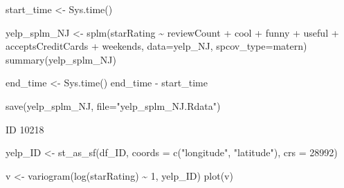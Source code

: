 \documentclass[
  12pt,
  letterpaper,
  DIV=11,
  numbers=noendperiod]{scrartcl}
\newenvironment{Shaded}{\begin{snugshade}}{\end{snugshade}}
\newcommand{\AttributeTok}[1]{\textcolor[rgb]{0.98,0.46,0.51}{#1}}
\newcommand{\DecValTok}[1]{\textcolor[rgb]{0.47,0.72,1.00}{#1}}
\newcommand{\FunctionTok}[1]{\textcolor[rgb]{0.70,0.57,0.94}{#1}}
\newcommand{\NormalTok}[1]{\textcolor[rgb]{0.88,0.89,0.91}{#1}}
\newcommand{\OtherTok}[1]{\textcolor[rgb]{0.70,0.57,0.94}{#1}}
\newcommand{\SpecialCharTok}[1]{\textcolor[rgb]{0.47,0.72,1.00}{#1}}
\newcommand{\StringTok}[1]{\textcolor[rgb]{0.62,0.80,1.00}{#1}}
\begin{document}
\begin{Shaded}
\begin{Highlighting}[]
\NormalTok{start\_time }\OtherTok{\textless{}{-}} \FunctionTok{Sys.time}\NormalTok{()}


\NormalTok{yelp\_splm\_NJ }\OtherTok{\textless{}{-}} \FunctionTok{splm}\NormalTok{(starRating }\SpecialCharTok{\textasciitilde{}}\NormalTok{ reviewCount }\SpecialCharTok{+}\NormalTok{ cool }\SpecialCharTok{+}\NormalTok{ funny }\SpecialCharTok{+}\NormalTok{ useful }\SpecialCharTok{+}\NormalTok{ acceptsCreditCards }\SpecialCharTok{+}\NormalTok{ weekends, }\AttributeTok{data=}\NormalTok{yelp\_NJ, }\AttributeTok{spcov\_type=}\StringTok{\textquotesingle{}matern\textquotesingle{}}\NormalTok{)}
\FunctionTok{summary}\NormalTok{(yelp\_splm\_NJ)}

\NormalTok{end\_time }\OtherTok{\textless{}{-}} \FunctionTok{Sys.time}\NormalTok{()}
\NormalTok{end\_time }\SpecialCharTok{{-}}\NormalTok{ start\_time}
\end{Highlighting}
\end{Shaded}

\begin{Shaded}
\begin{Highlighting}[]
\FunctionTok{save}\NormalTok{(yelp\_splm\_NJ, }\AttributeTok{file=}\StringTok{"yelp\_splm\_NJ.Rdata"}\NormalTok{)}
\end{Highlighting}
\end{Shaded}

ID 10218

\begin{Shaded}
\begin{Highlighting}[]
\NormalTok{yelp\_ID }\OtherTok{\textless{}{-}} \FunctionTok{st\_as\_sf}\NormalTok{(df\_ID, }\AttributeTok{coords =} \FunctionTok{c}\NormalTok{(}\StringTok{"longitude"}\NormalTok{, }\StringTok{"latitude"}\NormalTok{), }\AttributeTok{crs =} \DecValTok{28992}\NormalTok{)}
\end{Highlighting}
\end{Shaded}

\begin{Shaded}
\begin{Highlighting}[]
\NormalTok{v }\OtherTok{\textless{}{-}} \FunctionTok{variogram}\NormalTok{(}\FunctionTok{log}\NormalTok{(starRating) }\SpecialCharTok{\textasciitilde{}} \DecValTok{1}\NormalTok{, yelp\_ID)}
\FunctionTok{plot}\NormalTok{(v)}
\end{Highlighting}
\end{Shaded}
\end{document}
